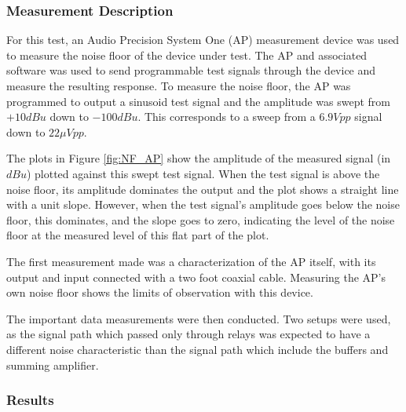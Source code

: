 		\subsubsection{Measurement Description}
		For this test, an Audio Precision System One (AP) measurement device was used to measure the noise floor of the device under test.  The AP and associated software was used to send programmable test signals through the device and measure the resulting response.  To measure the noise floor, the AP was programmed to output a sinusoid test signal and the amplitude was swept from $+10 dBu$ down to $-100 dBu$.  This corresponds to a sweep from a $6.9Vpp$ signal down to $22\mu Vpp$.

		The plots in Figure \ref{fig:NF_AP} show the amplitude of the measured signal (in $dBu$) plotted against this swept test signal.  When the test signal is above the noise floor, its amplitude dominates the output and the plot shows a straight line with a unit slope.  However, when the test signal's amplitude goes below the noise floor, this dominates, and the slope goes to zero, indicating the level of the noise floor at the measured level of this flat part of the plot.

		The first measurement made was a characterization of the AP itself, with its output and input connected with a two foot coaxial cable.  Measuring the AP's own noise floor shows the limits of observation with this device.

		The important data measurements were then conducted.  Two setups were used, as the signal path which passed only through relays was expected to have a different noise characteristic than the signal path which include the buffers and summing amplifier.

		\subsubsection{Results}


